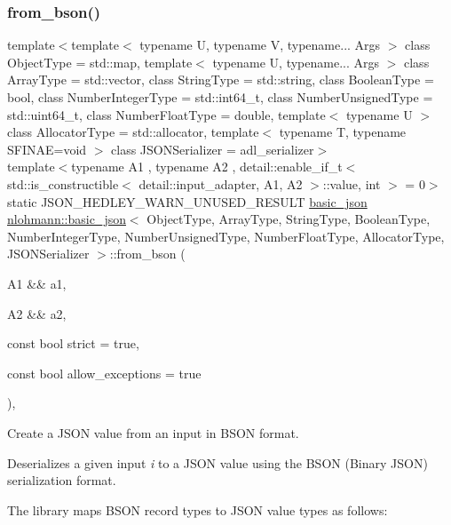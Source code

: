\subsubsection{\texorpdfstring{from\+\_\+bson()}{from\_bson()}\hspace{0.1cm}{\footnotesize\ttfamily [2/2]}}
{\footnotesize\ttfamily template$<$template$<$ typename U, typename V, typename... Args $>$ class Object\+Type = std\+::map, template$<$ typename U, typename... Args $>$ class Array\+Type = std\+::vector, class String\+Type  = std\+::string, class Boolean\+Type  = bool, class Number\+Integer\+Type  = std\+::int64\+\_\+t, class Number\+Unsigned\+Type  = std\+::uint64\+\_\+t, class Number\+Float\+Type  = double, template$<$ typename U $>$ class Allocator\+Type = std\+::allocator, template$<$ typename T, typename S\+F\+I\+N\+A\+E=void $>$ class J\+S\+O\+N\+Serializer = adl\+\_\+serializer$>$ \\
template$<$typename A1 , typename A2 , detail\+::enable\+\_\+if\+\_\+t$<$ std\+::is\+\_\+constructible$<$ detail\+::input\+\_\+adapter, A1, A2 $>$\+::value, int $>$  = 0$>$ \\
static J\+S\+O\+N\+\_\+\+H\+E\+D\+L\+E\+Y\+\_\+\+W\+A\+R\+N\+\_\+\+U\+N\+U\+S\+E\+D\+\_\+\+R\+E\+S\+U\+LT \mbox{\hyperlink{classnlohmann_1_1basic__json}{basic\+\_\+json}} \mbox{\hyperlink{classnlohmann_1_1basic__json}{nlohmann\+::basic\+\_\+json}}$<$ Object\+Type, Array\+Type, String\+Type, Boolean\+Type, Number\+Integer\+Type, Number\+Unsigned\+Type, Number\+Float\+Type, Allocator\+Type, J\+S\+O\+N\+Serializer $>$\+::from\+\_\+bson (\begin{DoxyParamCaption}\item[{A1 \&\&}]{a1,  }\item[{A2 \&\&}]{a2,  }\item[{const bool}]{strict = {\ttfamily true},  }\item[{const bool}]{allow\+\_\+exceptions = {\ttfamily true} }\end{DoxyParamCaption})\hspace{0.3cm}{\ttfamily [inline]}, {\ttfamily [static]}}



Create a J\+S\+ON value from an input in B\+S\+ON format. 

Deserializes a given input {\itshape i} to a J\+S\+ON value using the B\+S\+ON (Binary J\+S\+ON) serialization format.

The library maps B\+S\+ON record types to J\+S\+ON value types as follows\+:

